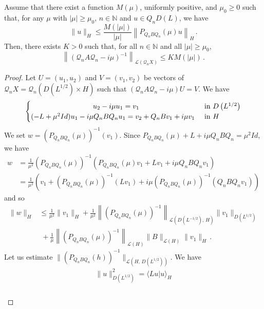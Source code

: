 \documentclass[10pt]{amsart}
\theoremstyle{definition}\newtheorem{defi}[theo]{Definition}\newtheorem{rema}[theo]{Remark}\newtheorem{exam}[theo]{Example}\newtheorem{exem}[theo]{Example}\newtheorem{nota}[theo]{Notation}
\newcommand{\NN}{\mathbb{N}}
\newcommand{\Lc}{\mathcal{L}}
\newcommand{\Qc}{\mathcal{Q}}
\begin{document}
\begin{prop}\label{prop-2-appendix}
Assume that there exist a function $M(\mu)$, uniformly positive, and $\mu_0\geq 0$ such that, for any $\mu$ with $|\mu|\geq
\mu_0$, $n\in\NN$ and $u\in Q_nD(L)$, we have
\begin{equation}\label{hyp-prop-2-appendix}
\|u\|_{H}\leq \frac{M(|\mu|)}{|\mu|} \left\|P_{Q_n B Q_n}(\mu)u\right\|_{H}\,.
\end{equation}
Then, there exists $K>0$ such that, for all $n\in\NN$ and all $|\mu|\geq \mu_0$,
\[
\left\|\left(\Qc_n A\Qc_n - i\mu \right)^{-1}\right\|_{\Lc(\Qc_nX)}\leq
K M(|\mu|)\,.
\]
\end{prop}
\begin{proof}
Let $U=(u_1,u_2)$ and $V=(v_1,v_2)$ be vectors of $\Qc_n X=\Qc_n (D(L^{1/2})\times H)$ such that $(\Qc_n A\Qc_n - i\mu)U=V$. We have
\begin{equation}\label{eq-demo-prop-2-appendix-1}
\begin{cases}
\mkern156mu u_2 -i\mu u_1 = v_1 & \text{ in }D\left(L^{1/2}\right)\\
(-L+\mu^2 Id) u_1-i\mu Q_n B Q_n u_1 = v_2 + Q_n B v_1 + i \mu v_1&\text{ in }H
\end{cases}
\end{equation}
We set $w=\left(P_{Q_n B Q_n}(\mu)\right)^{-1}(v_1)$. Since $P_{Q_n B Q_n}(\mu)+ L +i\mu Q_n BQ_n=\mu^2 Id$, we have
\begin{align*}
w&=\frac 1{\mu^2}\left(P_{Q_n B Q_n}(\mu)\right)^{-1}\left(P_{Q_n B Q_n}(\mu)v_1+ L v_1+i\mu Q_n B Q_n v_1\right)\\
&= \frac 1{\mu^2} \left(v_1+(P_{Q_n B Q_n}(\mu))^{-1}(L v_1)+i\mu (P_{Q_n B Q_n}(\mu))^{-1} (Q_n B Q_n v_1)\right)
\end{align*}
and so
\begin{equation}\label{eq-demo-prop-2-appendix-2}
\begin{aligned}
\|w\|_{H} &\leq \frac 1{\mu^2}\|v_1\|_{H} + \frac 1{\mu^2} \left\|(P_{Q_n B Q_n}(\mu))^{-1}\right\|_{\Lc\left(D(L^{-1/2}),\,H\right)} \|v_1\|_{D(L^{1/2})}\\
&\;+ \frac {1}\mu \left\|(P_{Q_n B Q_n}(\mu))^{-1}\right\|_{\Lc(H)} \| B \|_{\Lc(H)}
\|v_1\|_{H}\,.
\end{aligned}
\end{equation}
Let us estimate $\|(P_{Q_n B Q_n}(h))^{-1}\|_{\Lc(H,\,D(L^{1/2}))}$. We have
\begin{multline*}
\|u\|_{D(L^{1/2})}^2=\langle L u |u\rangle_{H}\\
\begin{aligned}

\end{aligned}
\end{multline*}
\end{proof}
\end{document}
